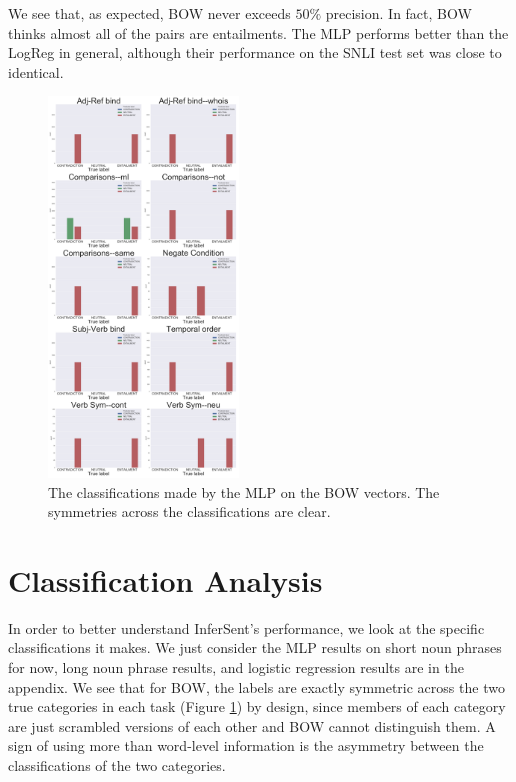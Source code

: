 \documentclass[10pt,letterpaper]{article}
\begin{document}
We see that, as expected, BOW never exceeds $50\%$ precision. In fact, BOW thinks almost all of the pairs are entailments. The MLP performs better than the LogReg in general, although their performance on the SNLI test set was close to identical. 


\begin{figure}[t!]
\centering
\includegraphics[width=0.45\textwidth]{AllHistsBOWMLPshorts.png}
\caption{The classifications made by the MLP on the BOW vectors. The symmetries across the classifications are clear.}
\label{fig:BOWhistMLPshorts}
\end{figure}

\section{Classification Analysis}

In order to better understand InferSent's performance, we look at the specific classifications it makes. We just consider the MLP results on short noun phrases for now, long noun phrase results, and logistic regression results are in the appendix. We see that for BOW, the labels are exactly symmetric across the two true categories in each task (Figure \ref{fig:BOWhistMLPshorts}) by design, since members of each category are just scrambled versions of each other and BOW cannot distinguish them. A sign of using more than word-level information is the asymmetry between the classifications of the two categories.
\end{document}
